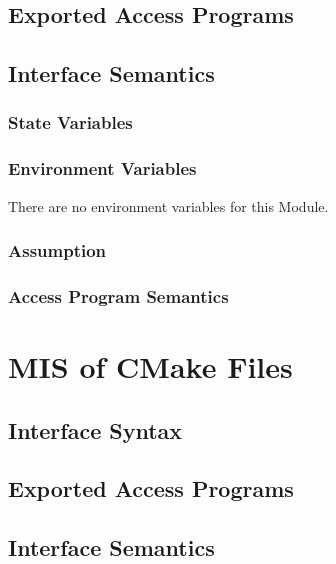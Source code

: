 \documentclass[12pt]{article}
\begin{document}
\subsection{Exported Access Programs}%

\subsection{Interface Semantics}

\subsubsection{State Variables}%

\subsubsection{Environment Variables}%
There are no environment variables for this Module.

\subsubsection{Assumption}%

\subsubsection{Access Program Semantics}%

\section{MIS of CMake Files}

\subsection{Interface Syntax}%

\subsection{Exported Access Programs}%

\subsection{Interface Semantics}
\end{document}
